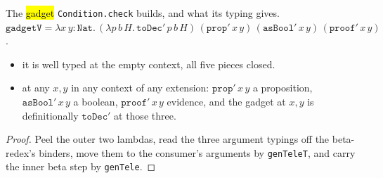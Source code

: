 \begin{theorem}
  \label{prim-cond:thm:condition-gadget}
  \leanok

   The \hl{gadget} \texttt{Condition.check} builds, and what its typing gives.
  $\mathtt{gadgetV} = \lambda x\,y : \mathtt{Nat}.\,(\lambda p\,b\,H.\,\mathtt{toDec}'\,p\,b\,H)\,(\mathtt{prop}'\,x\,y)\,(\mathtt{asBool}'\,x\,y)\,(\mathtt{proof}'\,x\,y)$.
  \begin{itemize}
  \item {} it is well typed at the empty context, all five pieces closed.
  \item {} at any $x, y$ in any context of any extension: $\mathtt{prop}'\,x\,y$ a
    proposition, $\mathtt{asBool}'\,x\,y$ a boolean, $\mathtt{proof}'\,x\,y$ evidence, and the
    gadget at $x, y$ is definitionally $\mathtt{toDec}'$ at those three.
  \end{itemize}
\end{theorem}
\begin{proof}
  \leanok
   Peel the outer two lambdas, read the three argument typings off the beta-redex's
  binders, move them to the consumer's arguments by \texttt{genTeleT}, and carry the inner beta
  step by \texttt{genTele}.
\end{proof}

